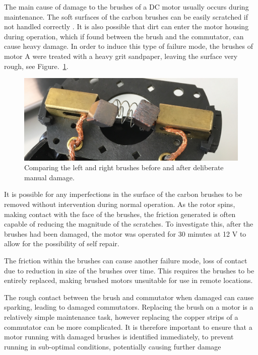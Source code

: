 The main cause of damage to the brushes of a DC motor usually occurs during maintenance. The soft surfaces of the carbon brushes can be easily scratched if not handled correctly \cite{hamilton2000dc}. It is also possible that dirt can enter the motor housing during operation, which if found between the brush and the commutator, can cause heavy damage. In order to induce this type of failure mode, the brushes of motor A were treated with a heavy grit sandpaper, leaving the surface very rough, see Figure.~\ref{fig:brush_damage}.

\begin{figure}[t]
    \includegraphics[width=1.0\textwidth]{fig/brush_comparison.jpg}
    \caption[Brush Damage]{Comparing the left and right brushes before and after deliberate manual damage.}
    \label{fig:brush_damage}
\end{figure}

It is possible for any imperfections in the surface of the carbon brushes to be removed without intervention during normal operation. As the rotor spins, making contact with the face of the brushes, the friction generated is often capable of reducing the magnitude of the scratches. To investigate this, after the brushes had been damaged, the motor was operated for 30 minutes at 12 V to allow for the possibility of self repair. %

The friction within the brushes can cause another failure mode, loss of contact due to reduction in size of the brushes over time. This requires the brushes to be entirely replaced, making brushed motors unsuitable for use in remote locations.

The rough contact between the brush and commutator when damaged can cause sparking, leading to damaged commutators. Replacing the brush on a motor is a relatively simple maintenance task, however replacing the copper strips of a commutator can be more complicated. It is therefore important to ensure that a motor running with damaged brushes is identified immediately, to prevent running in sub-optimal conditions, potentially causing further damage

